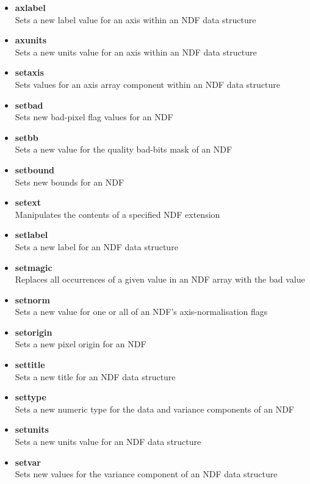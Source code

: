 \documentclass[twoside,11pt]{article}
\newcommand{\xref}[3]{#1}
\begin{document}
{\begin{itemize}
\item{\xref{{\bf axlabel}}{sun95}{AXLABEL}}\\
Sets a new label value for an axis within an NDF data structure 
\item{\xref{{\bf axunits}}{sun95}{AXUNITS}}\\
Sets a new units value for an axis within an NDF data structure 
\item{\xref{{\bf setaxis}}{sun95}{SETAXIS}}\\
Sets values for an axis array component within an NDF data structure 
\item{\xref{{\bf setbad}}{sun95}{SETBAD}}\\
Sets new bad-pixel flag values for an NDF 
\item{\xref{{\bf setbb}}{sun95}{SETBB}}\\
Sets a new value for the quality bad-bits mask of an NDF 
\item{\xref{{\bf setbound}}{sun95}{SETBOUND}}\\
Sets new bounds for an NDF 
\item{\xref{{\bf setext}}{sun95}{SETEXT}}\\
Manipulates the contents of a specified NDF extension 
\item{\xref{{\bf setlabel}}{sun95}{SETLABEL}}\\
Sets a new label for an NDF data structure 
\item{\xref{{\bf setmagic}}{sun95}{SETMAGIC}}\\
Replaces all occurrences of a given value in an NDF array with the bad value 
\item{\xref{{\bf setnorm}}{sun95}{SETNORM}}\\
Sets a new value for one or all of an NDF's axis-normalisation flags 
\item{\xref{{\bf setorigin}}{sun95}{SETORIGIN}}\\
Sets a new pixel origin for an NDF 
\item{\xref{{\bf settitle}}{sun95}{SETTITLE}}\\
Sets a new title for an NDF data structure 
\item{\xref{{\bf settype}}{sun95}{SETTYPE}}\\
Sets a new numeric type for the data and variance components of an NDF
\item{\xref{{\bf setunits}}{sun95}{SETUNITS}}\\
Sets a new units value for an NDF data structure 
\item{\xref{{\bf setvar}}{sun95}{SETVAR}}\\
Sets new values for the variance component of an NDF data structure     
\end{itemize}  
  
}
\end{document}
